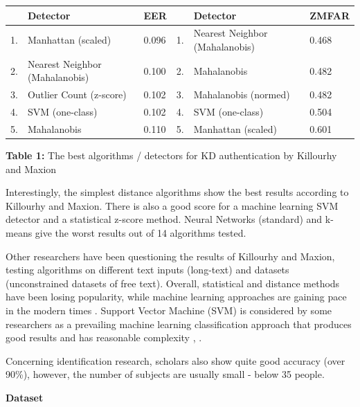 \documentclass[12pt,a4]{article}
\begin{document}
\begin{center}

\begin{tabular*}{\textwidth}{l @{\extracolsep{\fill}} lllll}

\hline
 & \textbf{Detector} & \textbf{EER} & & \textbf{Detector} & \textbf{ZMFAR} \\
 \hline
1. & Manhattan (scaled) & 0.096 & 1. & Nearest Neighbor (Mahalanobis) & 0.468 \\
\hline
2. & Nearest Neighbor (Mahalanobis) & 0.100 & 2. & Mahalanobis & 0.482 \\
\hline
3. & Outlier Count (z-score) & 0.102 & 3. & Mahalanobis (normed) & 0.482 \\

\hline
4. & SVM (one-class) & 0.102 & 4. & SVM (one-class) & 0.504 \\
\hline
5. & Mahalanobis & 0.110 & 5. & Manhattan (scaled) & 0.601 \\
\hline
\end{tabular*}
\textbf{Table 1:} The best algorithms / detectors for KD authentication by Killourhy and Maxion
\end{center}

Interestingly, the simplest distance algorithms show the best results according to Killourhy and Maxion. There is also a good score for a machine learning SVM detector and a statistical z-score method. Neural Networks (standard) and k-means give the worst results out of 14 algorithms tested.

Other researchers have been questioning the results of Killourhy and Maxion, testing algorithms on different text inputs (long-text) and datasets (unconstrained datasets of free text). Overall, statistical and distance methods have been losing popularity, while machine learning approaches are gaining pace in the modern times \cite{Liakat:2017}. Support Vector Machine (SVM) is  considered by some researchers as a prevailing machine learning classification approach that produces good results and has reasonable complexity \cite{Liakat:2017}, \cite{raul2020comprehensive}.

Concerning identification research, scholars also show quite good accuracy (over 90\%)\cite{banerjee2012biometric}, however, the number of subjects are usually small - below 35 people.

\bigskip
\large\textbf{Dataset}
\bigskip
\end{document}
